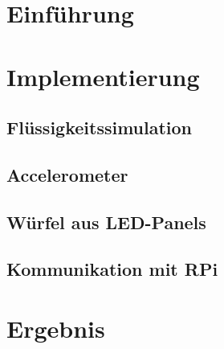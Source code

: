 \documentclass[12pt, a4paper]{book}
\begin{document}
\pagestyle{fancy}






\clearpage
\chapter{Einführung}
\label{chap:einfuehrung}


\chapter{Implementierung}
\label{chap:implementierung}

\clearpage
\section{Flüssigkeitssimulation}
\label{chap:impl:sph}

\clearpage
\section{Accelerometer}
\label{chap:impl:accel}

\clearpage
\section{Würfel aus LED-Panels}
\label{chap:impl:ledcube}

\section{Kommunikation mit RPi} %

\clearpage

\chapter{Ergebnis}


\clearpage




\clearpage\newpage
{}

\end{document}

